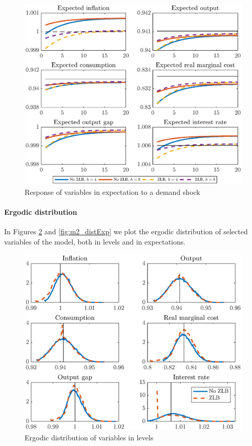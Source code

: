 \documentclass[12pt]{article}
\numberwithin{equation}{section}
\begin{document}
\begin{figure}[H]
	\centering
	\caption{Response of variables in expectation to a demand shock}\label{fig:m2_irfExp_pref}
	\includegraphics[scale=0.7]{m2_irfExp_pref}
\end{figure}

\paragraph{Ergodic distribution} In Figures \ref{fig:m2_distLevel} and \ref{fig:m2_distExp} we plot the ergodic distribution of selected variables of the model, both in levels and in expectations.

\begin{figure}[H]
	\centering
	\caption{Ergodic distribution of variables in levels}\label{fig:m2_distLevel}
	\includegraphics[scale=0.7]{m2_distLevel}
\end{figure}
\end{document}
